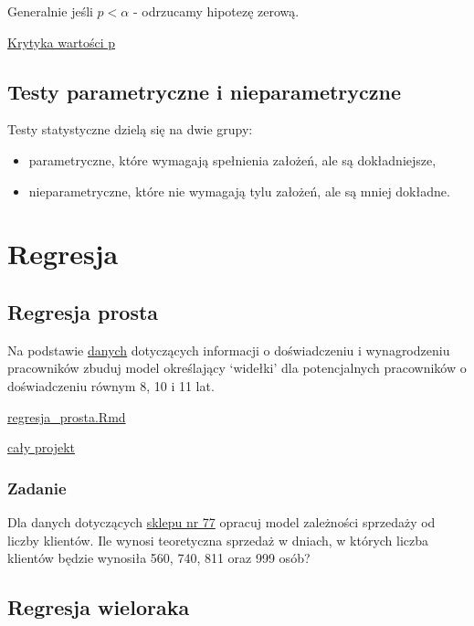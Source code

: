 \documentclass[]{book}
\providecommand{\tightlist}{%
  \setlength{\itemsep}{0pt}\setlength{\parskip}{0pt}}
\begin{document}
Generalnie jeśli \(p < \alpha\) - odrzucamy hipotezę zerową.

\href{http://idane.pl/blog/asa}{Krytyka wartości p}

\section{Testy parametryczne i
nieparametryczne}\label{testy-parametryczne-i-nieparametryczne}

Testy statystyczne dzielą się na dwie grupy:

\begin{itemize}
\tightlist
\item
  parametryczne, które wymagają spełnienia założeń, ale są
  dokładniejsze,
\item
  nieparametryczne, które nie wymagają tylu założeń, ale są mniej
  dokładne.
\end{itemize}

\chapter{Regresja}\label{regresja}

\section{Regresja prosta}\label{regresja-prosta}

Na podstawie \href{data/Salary_Data.csv}{danych} dotyczących informacji
o doświadczeniu i wynagrodzeniu pracowników zbuduj model określający
`widełki' dla potencjalnych pracowników o doświadczeniu równym 8, 10 i
11 lat.

\href{res/regresja_prosta.Rmd}{regresja\_prosta.Rmd}

\href{res/adr.zip}{cały projekt}

\subsection{Zadanie}\label{zadanie}

Dla danych dotyczących \href{data/sklep77.csv}{sklepu nr 77} opracuj
model zależności sprzedaży od liczby klientów. Ile wynosi teoretyczna
sprzedaż w dniach, w których liczba klientów będzie wynosiła 560, 740,
811 oraz 999 osób?

\section{Regresja wieloraka}\label{regresja-wieloraka}
\end{document}
